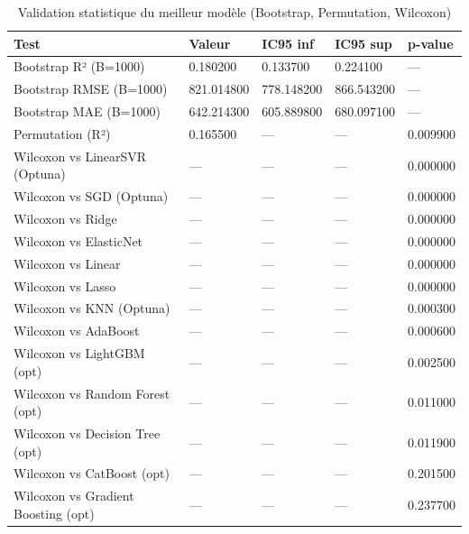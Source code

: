 \begin{table}
\caption{Validation statistique du meilleur modèle (Bootstrap, Permutation, Wilcoxon)}
\label{tab:validation}
\begin{tabular}{lllll}
\toprule
Test & Valeur & IC95 inf & IC95 sup & p-value \\
\midrule
Bootstrap R² (B=1000) & 0.180200 & 0.133700 & 0.224100 & — \\
Bootstrap RMSE (B=1000) & 821.014800 & 778.148200 & 866.543200 & — \\
Bootstrap MAE (B=1000) & 642.214300 & 605.889800 & 680.097100 & — \\
Permutation (R²) & 0.165500 & — & — & 0.009900 \\
Wilcoxon vs LinearSVR (Optuna) & — & — & — & 0.000000 \\
Wilcoxon vs SGD (Optuna) & — & — & — & 0.000000 \\
Wilcoxon vs Ridge & — & — & — & 0.000000 \\
Wilcoxon vs ElasticNet & — & — & — & 0.000000 \\
Wilcoxon vs Linear & — & — & — & 0.000000 \\
Wilcoxon vs Lasso & — & — & — & 0.000000 \\
Wilcoxon vs KNN (Optuna) & — & — & — & 0.000300 \\
Wilcoxon vs AdaBoost & — & — & — & 0.000600 \\
Wilcoxon vs LightGBM (opt) & — & — & — & 0.002500 \\
Wilcoxon vs Random Forest (opt) & — & — & — & 0.011000 \\
Wilcoxon vs Decision Tree (opt) & — & — & — & 0.011900 \\
Wilcoxon vs CatBoost (opt) & — & — & — & 0.201500 \\
Wilcoxon vs Gradient Boosting (opt) & — & — & — & 0.237700 \\
\bottomrule
\end{tabular}
\end{table}
